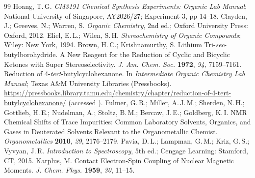 \documentclass[11pt,a4paper]{article}
\begin{document}
\begin{thebibliography}{99}
\small
\setlength{\itemsep}{1pt}
 Hoang, T.\,G. \emph{CM3191 Chemical Synthesis Experiments: Organic Lab Manual}; National University of Singapore, AY2026/27; Experiment 3, pp 14--18.
 Clayden, J.; Greeves, N.; Warren, S. \emph{Organic Chemistry}, 2nd ed.; Oxford University Press: Oxford, 2012.
 Eliel, E.\,L.; Wilen, S.\,H. \emph{Stereochemistry of Organic Compounds}; Wiley: New York, 1994.
 Brown, H.\,C.; Krishnamurthy, S. Lithium Tri-\emph{sec}-butylborohydride. A New Reagent for the Reduction of Cyclic and Bicyclic Ketones with Super Stereoselectivity. \emph{J. Am. Chem. Soc.} \textbf{1972}, \emph{94}, 7159--7161.
 Reduction of 4-\emph{tert}-butylcyclohexanone. In \emph{Intermediate Organic Chemistry Lab Manual}; Texas A\&M University Libraries (Pressbooks). \url{https://pressbooks.library.tamu.edu/chemistry/chapter/reduction-of-4-tert-butylcyclohexanone/} (accessed ).
 Fulmer, G.\,R.; Miller, A.\,J.\,M.; Sherden, N.\,H.; Gottlieb, H.\,E.; Nudelman, A.; Stoltz, B.\,M.; Bercaw, J.\,E.; Goldberg, K.\,I. NMR Chemical Shifts of Trace Impurities: Common Laboratory Solvents, Organics, and Gases in Deuterated Solvents Relevant to the Organometallic Chemist. \emph{Organometallics} \textbf{2010}, \emph{29}, 2176--2179.
 Pavia, D.\,L.; Lampman, G.\,M.; Kriz, G.\,S.; Vyvyan, J.\,R. \emph{Introduction to Spectroscopy}, 5th ed.; Cengage Learning: Stamford, CT, 2015.
 Karplus, M. Contact Electron-Spin Coupling of Nuclear Magnetic Moments. \emph{J. Chem. Phys.} \textbf{1959}, \emph{30}, 11--15.
\end{thebibliography}
\end{document}
